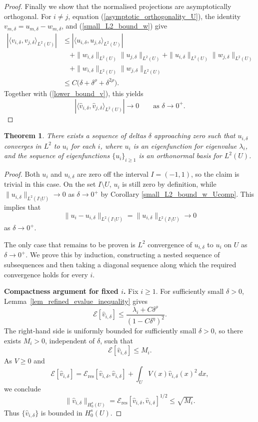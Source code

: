 \documentclass[preprint,12pt]{elsarticle}
\newtheorem{theorem}{Theorem}[section]
\begin{document}
{\begin{proof}
Finally we show that the normalised projections are asymptotically orthogonal. For $i\neq j$, equation
(\ref{asymptotic_orthogonality_U}), the identity
$v_{m,\delta}=u_{m,\delta}-w_{m,\delta}$, and
(\ref{small_L2_bound_w}) give
\begin{align*}
\left|
\langle v_{i,\delta},v_{j,\delta}\rangle_{L^2(U)}
\right|
&\leq
\left|
\langle u_{i,\delta},u_{j,\delta}\rangle_{L^2(U)}
\right|\\
&\quad+
\|w_{i,\delta}\|_{L^2(U)}
\|u_{j,\delta}\|_{L^2(U)}
+
\|u_{i,\delta}\|_{L^2(U)}
\|w_{j,\delta}\|_{L^2(U)}\\
&\quad+
\|w_{i,\delta}\|_{L^2(U)}
\|w_{j,\delta}\|_{L^2(U)}\\
&\leq
C\bigl(\delta+\delta^\rho+\delta^{2\rho}\bigr).
\end{align*}
Together with (\ref{lower_bound_v}), this yields
\[
    \left|
    \langle
    \hat v_{i,\delta},
    \hat v_{j,\delta}
    \rangle_{L^2(U)}
    \right|
    \longrightarrow0
    \qquad
    \text{as }\delta\to0^+.
\]
\end{proof}

\begin{theorem}\label{L2_convergence_efunctions} There exists a sequence of deltas $\delta$ approaching zero such that $u_{i,\delta}$ converges in $L^2$ to $u_i$ for each $i$, where $u_i$ is an eigenfunction for eigenvalue $\lambda_i$, and the sequence of eigenfunctions $\{u_i\}_{i\geq 1}$ is an orthonormal basis for $L^2(U)$.
\end{theorem}
\begin{proof} Both $u_i$ and $u_{i,\delta}$ are zero off the interval $I=(-1,1)$, so the claim is trivial in this case. On the set $I\setminus U$, $u_i$ is still zero by definition, while $\|u_{i,\delta}\|_{L^2(I\setminus U)}\to 0$ as $\delta\to 0^+$ by
Corollary \ref{small_L2_bound_w_Ucomp}.
This implies that
\[
    \|u_i-u_{i,\delta}\|_{L^2(I\setminus U)}
    =
    \|u_{i,\delta}\|_{L^2(I\setminus U)}
    \to0
\]
as $\delta\to0^+$.

The only case that remains to be proven is $L^2$ convergence of $u_{i,\delta}$ to $u_i$ on $U$ as $\delta\to0^+$. We prove this by induction, constructing a nested sequence of subsequences and then taking a diagonal sequence along which the required convergence holds for every $i$. 

\textbf{Compactness argument for fixed $i$.}
Fix $i\geq1$. For sufficiently small $\delta>0$,
Lemma~\ref{lem_refined_evalue_inequality} gives
\[
    \mathcal E[\hat v_{i,\delta}]
    \leq
    \frac{\lambda_i+C\delta^\rho}
         {(1-C\delta^\eta)^2}.
\]
The right-hand side is uniformly bounded for sufficiently
small $\delta>0$, so there exists $M_i>0$, independent of $\delta$,
such that
\[
    \mathcal E[\hat v_{i,\delta}]\leq M_i.
\]
As $V\geq0$ and
\[
    \mathcal E[\hat v_{i,\delta}]
    =
    \mathcal E_{\mathrm{res}}
    [\hat v_{i,\delta},\hat v_{i,\delta}]
    +
    \int_U V(x)\hat v_{i,\delta}(x)^2\,dx,
\]
we conclude
\[
    \|\hat v_{i,\delta}\|_{H_0^s(U)}
    =
    \mathcal E_{\mathrm{res}}
    [\hat v_{i,\delta},\hat v_{i,\delta}]^{1/2}
    \leq \sqrt{M_i}.
\]
Thus $\{\hat v_{i,\delta}\}$ is bounded in $H_0^s(U)$.


\end{proof}}
\end{document}
